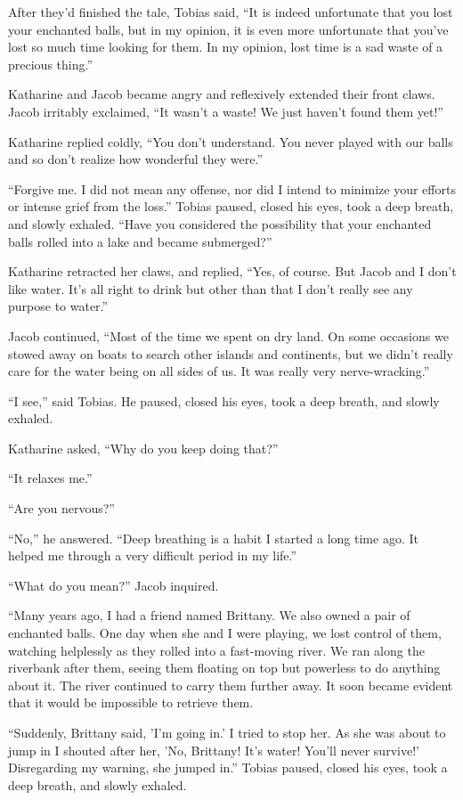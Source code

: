 After they'd finished the tale, Tobias said, “It is indeed unfortunate that you lost your enchanted balls, but in my opinion, it is even more unfortunate that you've lost so much time looking for them. In my opinion, lost time is a sad waste of a precious thing.”

Katharine and Jacob became angry and reflexively extended their front claws. Jacob irritably exclaimed, “It wasn't a waste! We just haven't found them yet!”

Katharine replied coldly, “You don't understand. You never played with our balls and so don't realize how wonderful they were.”

“Forgive me. I did not mean any offense, nor did I intend to minimize your efforts or intense grief from the loss.” Tobias paused, closed his eyes, took a deep breath, and slowly exhaled. “Have you considered the possibility that your enchanted balls rolled into a lake and became submerged?”

Katharine retracted her claws, and replied, “Yes, of course. But Jacob and I don't like water. It's all right to drink but other than that I don't really see any purpose to water.”

Jacob continued, “Most of the time we spent on dry land. On some occasions we stowed away on boats to search other islands and continents, but we didn't really care for the water being on all sides of us. It was really very nerve-wracking.”

“I see,” said Tobias. He paused, closed his eyes, took a deep breath, and slowly exhaled.

Katharine asked, “Why do you keep doing that?”

“It relaxes me.”

“Are you nervous?”

“No,” he answered. “Deep breathing is a habit I started a long time ago. It helped me through a very difficult period in my life.”

“What do you mean?” Jacob inquired.

“Many years ago, I had a friend named Brittany. We also owned a pair of enchanted balls. One day when she and I were playing, we lost control of them, watching helplessly as they rolled into a fast-moving river. We ran along the riverbank after them, seeing them floating on top but powerless to do anything about it. The river continued to carry them further away. It soon became  evident that it would be impossible to retrieve them.

“Suddenly, Brittany said, 'I'm going in.' I tried to stop her. As she was about to jump in I shouted after her, 'No, Brittany! It's water! You'll never survive!' Disregarding my warning, she jumped in.” Tobias paused, closed his eyes, took a deep breath, and slowly exhaled.


